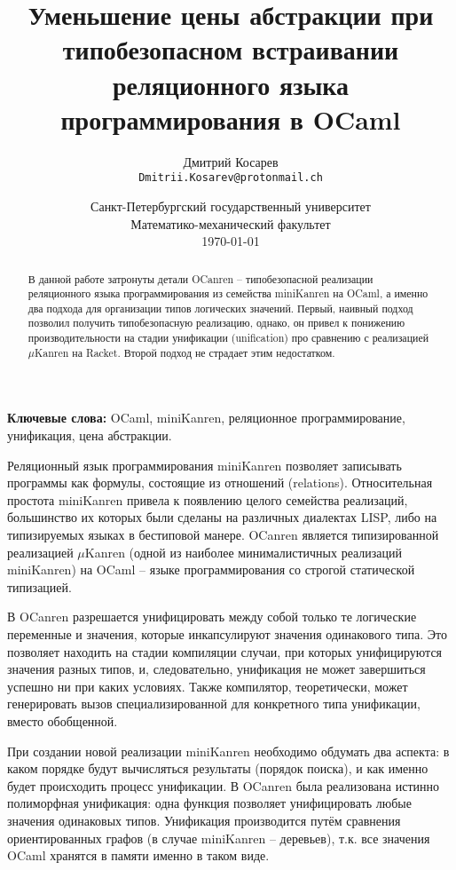\documentclass[10pt]{article}
\title{Уменьшение цены абстракции при типобезопасном встраивании реляционного языка программирования в OCaml}
\author{
        Дмитрий Косарев\\ \texttt{Dmitrii.Kosarev@protonmail.ch}
}
\date{
  Санкт-Петербургский государственный университет\\
  Математико-механический факультет\\
  \today
}
\begin{document}
\maketitle

\begin{abstract}
В данной работе затронуты детали OCanren -- типобезопасной реализации реляционного языка программирования
из семейства miniKanren на OCaml, а именно два подхода для организации типов логических значений. Первый,
наивный подход позволил получить типобезопасную реализацию, однако, он привел к понижению производительности
на стадии унификации (unification) про сравнению с реализацией $\mu$Kanren на Racket. Второй подход не 
страдает этим недостатком.

\end{abstract}

\textbf{Ключевые слова:} OCaml, miniKanren, реляционное программирование, унификация, цена абстракции.

\vspace{5mm}

Реляционный язык программирования miniKanren
позволяет записывать программы как формулы, состоящие из отношений
(relations). Относительная простота miniKanren привела к появлению целого семейства реализаций, большинство их 
которых были сделаны на различных диалектах LISP, либо на типизируемых языках в бестиповой манере. OCanren\cite{OCanren} 
является типизированной реализацией $\mu$Kanren\cite{uKanren} (одной из наиболее минималистичных реализаций miniKanren) 
на OCaml -- языке программирования со строгой статической типизацией.

В OCanren разрешается унифицировать между собой только те логические переменные и значения, которые инкапсулируют
значения одинакового типа. Это позволяет находить на стадии компиляции случаи, при которых унифицируются 
значения разных типов, и, следовательно, унификация не может завершиться успешно ни при каких условиях. Также
компилятор, теоретически, может генерировать вызов специализированной для конкретного типа унификации, вместо 
обобщенной.

При создании новой реализации miniKanren необходимо обдумать два аспекта: в каком порядке будут вычисляться 
результаты (порядок поиска), и как именно будет происходить процесс унификации. В OCanren была реализована истинно 
полиморфная унификация: одна функция позволяет унифицировать любые значения одинаковых типов. Унификация производится
путём сравнения ориентированных графов (в случае miniKanren -- деревьев), т.к. все значения OCaml хранятся в 
памяти именно в таком виде.
\end{document}
